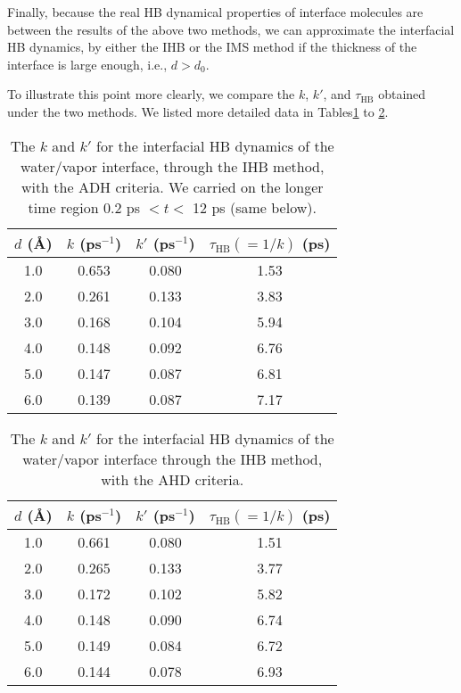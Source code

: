 Finally, because the real HB dynamical properties of interface molecules are between the results of the above two methods, 
we can approximate the interfacial HB dynamics, by either the IHB or the IMS method if the thickness of the interface is large enough, i.e., $d>d_0$.


%
To illustrate this point more clearly, we compare the $k$, $k'$, and $\tau_\text{HB}$ obtained under the two methods.
We listed more detailed data in Tables\thinspace\ref{tab:k_k_prime_tau_128w_pure_ihb_ADH} to \ref{tab:k_k_prime_tau_128w_pure_ihb_AHD}.
\begin{table}[H]%
\centering
\caption{\label{tab:k_k_prime_tau_128w_pure_ihb_ADH} 
    The $k$ and $k'$ for the interfacial HB dynamics of the water/vapor interface, through the IHB method, with the ADH criteria. 
We carried on the longer time region 0.2 ps $< t <$ 12 ps (same below). 
}
\begin{tabular}{cccc}
 $d$ (\AA) & $k$ (ps$^{-1}$) & $k'$ (ps$^{-1}$)& $\tau_{\text{HB}} (=1/k)$ (ps) \\
\hline
  1.0 & 0.653 & 0.080 & 1.53  \\
  2.0 & 0.261 & 0.133 & 3.83  \\
  3.0 & 0.168 & 0.104 & 5.94  \\
  4.0 & 0.148 & 0.092 & 6.76  \\
  5.0 & 0.147 & 0.087 & 6.81  \\
  6.0 & 0.139 & 0.087 & 7.17  \\
\end{tabular}
\end{table}
\begin{table}[htb]
\centering
\caption{\label{tab:k_k_prime_tau_128w_pure_ihb_AHD} 
    The $k$ and $k'$ for the interfacial HB dynamics of the water/vapor interface through the IHB method, with the AHD criteria.} 
\begin{tabular}{cccc}
 $d$ (\AA) & $k$ (ps$^{-1}$) & $k'$ (ps$^{-1}$) & $\tau_{\text{HB}} (=1/k)$ (ps) \\
\hline
  1.0 & 0.661 & 0.080 & 1.51  \\
  2.0 & 0.265 & 0.133 & 3.77  \\
  3.0 & 0.172 & 0.102 & 5.82  \\
  4.0 & 0.148 & 0.090 & 6.74  \\
  5.0 & 0.149 & 0.084 & 6.72  \\
  6.0 & 0.144 & 0.078 & 6.93  \\
\end{tabular}
\end{table}

